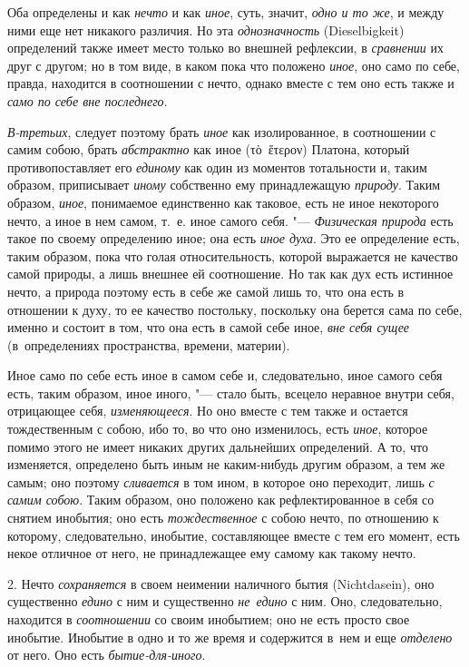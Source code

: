 Оба определены и как {\em нечто} и как {\em иное}, суть, значит,
{\em одно и то же}, и между ними еще нет никакого
различия. Но эта {\em однозначность} (Dieselbigkeit)
определений также имеет место только во внешней рефлексии, в
{\em сравнении} их друг с другом; но в том виде, в
каком пока что положено {\em иное}, оно само по себе,
правда, находится в соотношении с нечто, однако вместе с тем оно есть также
и {\em само по себе вне последнего}.

{\em В-третьих}, следует поэтому брать {\em иное} как изолированное,
в соотношении с самим собою, брать {\em абстрактно}
как иное (\textgreek{τὸ~ἕτερον}) Платона, который
противопоставляет его {\em единому} как один из
моментов тотальности и, таким образом, приписывает
{\em иному} собственно ему принадлежащую {\em природу}. Таким образом,
{\em иное}, понимаемое единственно как таковое, есть
не иное некоторого нечто, а иное в нем самом, т.~е. иное самого себя.
"--- {\em Физическая природа} есть такое по своему
определению иное; она есть {\em иное духа}. Это ее
определение есть, таким образом, пока что голая относительность, которой
выражается не качество самой природы, а лишь внешнее ей соотношение. Но так
как дух есть истинное нечто, а природа поэтому есть в себе же самой лишь
то, что она есть в отношении к духу, то ее качество постольку, поскольку
она берется сама по себе, именно и состоит в том, что она есть в самой себе
иное, {\em вне себя сущее} (в~определениях пространства, времени, материи).

Иное само по себе есть иное в самом себе и, следовательно, иное самого
себя есть, таким образом, иное иного, "--- стало быть, всецело неравное
внутри себя, отрицающее себя, {\em изменяющееся}. Но
оно вместе с тем также и остается тождественным с собою, ибо то, во что оно
изменилось, есть {\em иное}, которое помимо этого не
имеет никаких других дальнейших определений. А то, что изменяется,
определено быть иным не каким-нибудь другим образом, а тем же самым; оно
поэтому {\em сливается} в том ином, в которое оно
переходит, лишь {\em с самим собою}. Таким образом, оно
положено как рефлектированное в себя со снятием инобытия; оно есть
{\em тождественное} с собою нечто, по отношению к
которому, следовательно, инобытие, составляющее вместе с тем его момент,
есть некое отличное от него, не принадлежащее ему самому как такому нечто.

2. Нечто {\em сохраняется} в своем неимении наличного
бытия (Nicht\-dasein), оно существенно {\em едино} с ним
и существенно {\em не~едино} с ним. Оно, следовательно,
находится в {\em соотношении} со своим инобытием; оно не есть просто
свое инобытие. Инобытие в одно и то же время и содержится в~нем
и еще {\em отделено} от него. Оно есть {\em бытие-для-иного}.

